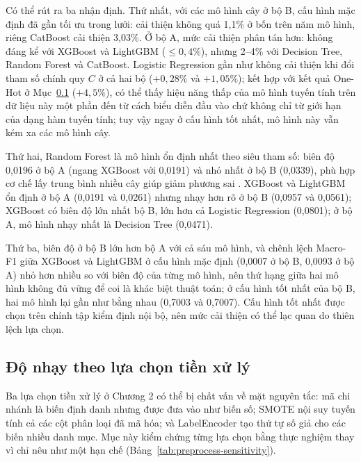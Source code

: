 Có thể rút ra ba nhận định. Thứ nhất, với các mô hình cây ở bộ B, cấu hình mặc định đã gần tối ưu trong lưới: cải thiện không quá 1,1\% ở bốn trên năm mô hình, riêng CatBoost cải thiện 3,03\%. Ở bộ A, mức cải thiện phân tán hơn: không đáng kể với XGBoost và LightGBM ($\leq 0,4\%$), nhưng 2--4\% với Decision Tree, Random Forest và CatBoost. Logistic Regression gần như không cải thiện khi đổi tham số chính quy $C$ ở cả hai bộ ($+0,28\%$ và $+1,05\%$); kết hợp với kết quả One-Hot ở Mục~\ref{sec:preprocess-sensitivity} ($+4,5\%$), có thể thấy hiệu năng thấp của mô hình tuyến tính trên dữ liệu này một phần đến từ cách biểu diễn đầu vào chứ không chỉ từ giới hạn của dạng hàm tuyến tính; tuy vậy ngay ở cấu hình tốt nhất, mô hình này vẫn kém xa các mô hình cây.

Thứ hai, Random Forest là mô hình ổn định nhất theo siêu tham số: biên độ 0,0196 ở bộ A (ngang XGBoost với 0,0191) và nhỏ nhất ở bộ B (0,0339), phù hợp cơ chế lấy trung bình nhiều cây giúp giảm phương sai \cite{breiman2001random}. XGBoost và LightGBM ổn định ở bộ A (0,0191 và 0,0261) nhưng nhạy hơn rõ ở bộ B (0,0957 và 0,0561); XGBoost có biên độ lớn nhất bộ B, lớn hơn cả Logistic Regression (0,0801); ở bộ A, mô hình nhạy nhất là Decision Tree (0,0471).

Thứ ba, biên độ ở bộ B lớn hơn bộ A với cả sáu mô hình, và chênh lệch Macro-F1 giữa XGBoost và LightGBM ở cấu hình mặc định (0,0007 ở bộ B, 0,0093 ở bộ A) nhỏ hơn nhiều so với biên độ của từng mô hình, nên thứ hạng giữa hai mô hình không đủ vững để coi là khác biệt thuật toán; ở cấu hình tốt nhất của bộ B, hai mô hình lại gần như bằng nhau (0,7003 và 0,7007). Cấu hình tốt nhất được chọn trên chính tập kiểm định nội bộ, nên mức cải thiện có thể lạc quan do thiên lệch lựa chọn.

\subsection{Độ nhạy theo lựa chọn tiền xử lý}
\label{sec:preprocess-sensitivity}

Ba lựa chọn tiền xử lý ở Chương 2 có thể bị chất vấn về mặt nguyên tắc: mã chi nhánh là biến định danh nhưng được đưa vào như biến số; SMOTE nội suy tuyến tính cả các cột phân loại đã mã hóa; và LabelEncoder tạo thứ tự số giả cho các biến nhiều danh mục. Mục này kiểm chứng từng lựa chọn bằng thực nghiệm thay vì chỉ nêu như một hạn chế (Bảng~\ref{tab:preprocess-sensitivity}).

